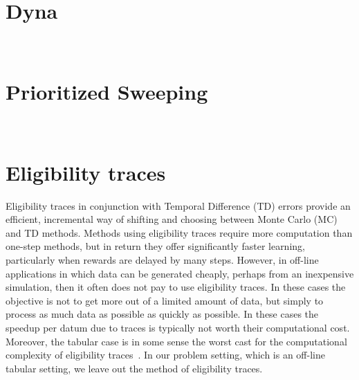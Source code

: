 \documentclass{article}
\begin{document}
\section{Dyna} ~\cite{sutton1990integrated}

\section{Prioritized Sweeping} ~\cite{peng1993efficient}

\section{Eligibility traces} 
Eligibility traces in conjunction with Temporal Difference (TD) errors provide an efficient, incremental way of shifting and choosing between Monte Carlo (MC) and TD methods. Methods using eligibility traces require more computation than one-step methods, but in return they offer significantly faster learning, particularly when rewards are delayed by many steps. However, in off-line applications in which data can be generated cheaply, perhaps from an inexpensive simulation, then it often does not pay to use eligibility traces. In these cases the objective is not to get more out of a limited amount of data, but simply to process as much data as possible as quickly as possible. In these cases the speedup per datum due to traces is typically not worth their computational cost. Moreover, the tabular case is in some sense the worst cast for the computational complexity of eligibility traces~\cite{sutton2018reinforcement}.
In our problem setting, which is an off-line tabular setting, we leave out the method of eligibility traces.
\end{document}
